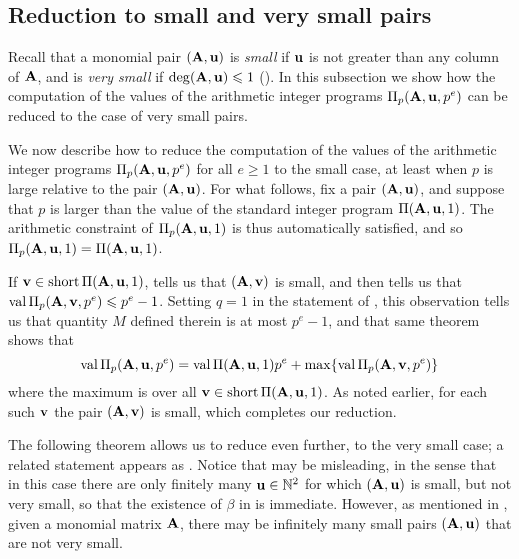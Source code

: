 \documentclass{article}
\begin{document}
\subsection{Reduction to small and very small pairs}

Recall that a monomial pair $(\mathbf{A}, \mathbf{u})$ is \emph{small} if $\mathbf{u}$ is not greater than any column of $\mathbf{A}$, and is \emph{very small} if $\operatorname{deg}(\mathbf{A},\mathbf{u}) \leqslant 1$ ().
In this subsection we show how the computation of the values of the arithmetic integer programs $\Pi_p(\mathbf{A},\mathbf{u},p^e)$ can be reduced to the case of very small pairs.

\begin{remark}
   We now describe how to reduce the computation of the values of the arithmetic integer programs $\Pi_p(\mathbf{A}, \mathbf{u}, p^e)$ for all $e \geq 1$ to the small case, at least when $p$ is large relative to the pair $(\mathbf{A}, \mathbf{u})$.
   For what follows, fix a pair $(\mathbf{A}, \mathbf{u})$, and suppose that $p$ is larger than the value of the standard integer program $\Pi(\mathbf{A}, \mathbf{u},1)$.
   The arithmetic constraint of $\Pi_p(\mathbf{A},\mathbf{u},1)$ is thus automatically satisfied, and so $\Pi_p(\mathbf{A}, \mathbf{u}, 1) = \Pi(\mathbf{A}, \mathbf{u}, 1)$.

   If $\mathbf{v} \in \operatorname{short} \Pi(\mathbf{A},\mathbf{u},1)$,  tells us that $(\mathbf{A}, \mathbf{v})$ is small, and   then tells us that $\operatorname{val} \Pi_p(\mathbf{A}, \mathbf{v}, p^e) \leqslant p^e-1$.
   Setting $q=1$ in the statement of , this observation tells us that quantity $M$ defined therein is at most $p^e-1$, and that same theorem shows that
   \[ \operatorname{val} \Pi_p(\mathbf{A}, \mathbf{u},p^e) = \operatorname{val} \Pi(\mathbf{A}, \mathbf{u},1)p^e + \max \{ \operatorname{val} \Pi_p(\mathbf{A}, \mathbf{v}, p^e) \}\]
   where the maximum is over all $\mathbf{v} \in \operatorname{short} \Pi(\mathbf{A}, \mathbf{u},1)$.
   As noted earlier, for each such $\mathbf{v}$ the pair $(\mathbf{A},\mathbf{v})$ is small, which completes our reduction.
\end{remark}

The following theorem allows us to reduce even further, to the very small case; a related statement appears as \cite[Theorem~6.4]{hernandez+etal.frobenius_powers}.
Notice that  may be misleading, in the sense that in this case there are only finitely many $\mathbf{u} \in \mathbb{N}^2$ for which $(\mathbf{A}, \mathbf{u})$ is small, but not very small, so that the existence of $\beta$ in  is immediate.
However, as mentioned in , given a monomial matrix $\mathbf{A}$, there may be infinitely many small pairs $(\mathbf{A}, \mathbf{u})$ that are not very small.
\end{document}

